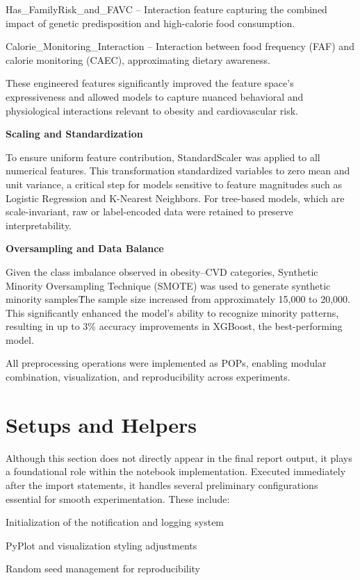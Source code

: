 Has\_FamilyRisk\_and\_FAVC – Interaction feature capturing the combined impact of genetic predisposition and high-calorie food consumption.

Calorie\_Monitoring\_Interaction – Interaction between food frequency (FAF) and calorie monitoring (CAEC), approximating dietary awareness.

These engineered features significantly improved the feature space’s expressiveness and allowed models to capture nuanced behavioral and physiological interactions relevant to obesity and cardiovascular risk.

\textbf{Scaling and Standardization}

To ensure uniform feature contribution, StandardScaler was applied to all numerical features.
This transformation standardized variables to zero mean and unit variance, a critical step for models sensitive to feature magnitudes such as Logistic Regression and K-Nearest Neighbors.
For tree-based models, which are scale-invariant, raw or label-encoded data were retained to preserve interpretability.

\textbf{Oversampling and Data Balance}

Given the class imbalance observed in obesity–CVD categories, Synthetic Minority Oversampling Technique (SMOTE) was used to generate synthetic minority samples\. The sample size increased from approximately 15,000 to 20,000.
This significantly enhanced the model’s ability to recognize minority patterns, resulting in up to 3\% accuracy improvements in XGBoost, the best-performing model.

All preprocessing operations were implemented as POPs, enabling modular combination, visualization, and reproducibility across experiments.


\section{Setups and Helpers}\label{sec:setups-and-helpers}
Although this section does not directly appear in the final report output, it plays a foundational role within the notebook implementation.
Executed immediately after the import statements, it handles several preliminary configurations essential for smooth experimentation.
These include:

Initialization of the notification and logging system

PyPlot and visualization styling adjustments

Random seed management for reproducibility

